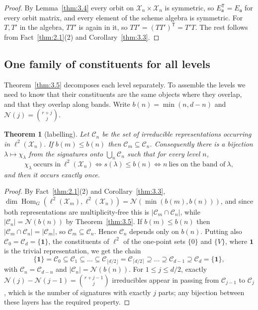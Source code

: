 \documentclass[11pt]{article}
\numberwithin{equation}{section}
\theoremstyle{plain}
\newtheorem{theorem}{Theorem}[section]
\theoremstyle{definition}
\begin{document}
\begin{proof}
By Lemma~\ref{thm:3.4} every orbit on $\mathcal{X}_n\times \mathcal{X}_n$ is symmetric, so
$E_{\mathfrak{a}}^{\mathsf T}=E_{\mathfrak{a}}$ for every orbit matrix, and every element of the scheme algebra
is symmetric. For $T,T'$ in the algebra, $TT'$ is again in it, so
$TT'=(TT')^{\mathsf T}=T'T$. The rest follows from Fact~\ref{thm:2.1}(2) and Corollary~\ref{thm:3.3}.
\end{proof}

\subsection{One family of constituents for all levels}\label{sec:3.3}

Theorem~\ref{thm:3.5} decomposes each level separately. To assemble the levels we need to know
that their constituents are the same objects where they overlap, and that they overlap
along bands. Write $b(n)=\min(n,d-n)$ and $\mathcal N(j)=\binom{r+j}{j}$.

\begin{theorem}[labelling]\label{thm:3.6}
Let $\mathcal C_n$ be the set of irreducible
representations occurring in $\ell^2(\mathcal{X}_n)$. If $b(m)\le b(n)$ then
$\mathcal C_m\subseteq\mathcal C_n$. Consequently there is a bijection
$\lambda\mapsto\chi_\lambda$ from the signatures onto $\bigcup_n\mathcal C_n$ such that
for every level $n$,
\[
\chi_\lambda\ \text{occurs in}\ \ell^2(\mathcal{X}_n)\iff s(\lambda)\le b(n)
\iff n\ \text{lies on the band of}\ \lambda,
\]
and then it occurs exactly once.
\end{theorem}

\begin{proof}
By Fact~\ref{thm:2.1}(2) and Corollary~\ref{thm:3.3},
$\dim\operatorname{Hom}_G(\ell^2(\mathcal{X}_m),\ell^2(\mathcal{X}_n))=\mathcal N(\min(b(m),b(n)))$, and
since both representations are multiplicity-free this is
$|\mathcal C_m\cap\mathcal C_n|$, while $|\mathcal C_n|=\mathcal N(b(n))$ by
Theorem~\ref{thm:3.5}. If $b(m)\le b(n)$ then $|\mathcal C_m\cap\mathcal C_n|=|\mathcal C_m|$, so
$\mathcal C_m\subseteq\mathcal C_n$. Hence $\mathcal C_n$ depends only on $b(n)$. Putting
also $\mathcal C_0=\mathcal C_d=\{\mathbf 1\}$, the constituents of $\ell^2$ of the
one-point sets $\{0\}$ and $\{V\}$, where $\mathbf 1$ is the trivial representation, we
get the chain
\[
\{\mathbf 1\}=\mathcal C_0\subseteq\mathcal C_1\subseteq\dots\subseteq
\mathcal C_{\lfloor d/2\rfloor}=\mathcal C_{\lceil d/2\rceil}\supseteq\dots\supseteq
\mathcal C_{d-1}\supseteq\mathcal C_d=\{\mathbf 1\},
\]
with $\mathcal C_n=\mathcal C_{d-n}$ and $|\mathcal C_n|=\mathcal N(b(n))$. For
$1\le j\le d/2$, exactly $\mathcal N(j)-\mathcal N(j-1)=\binom{r+j-1}{j}$ irreducibles
appear in passing from $\mathcal C_{j-1}$ to $\mathcal C_j$, which is the number of
signatures with exactly $j$ parts; any bijection between these layers has the required
property.
\end{proof}
\end{document}
